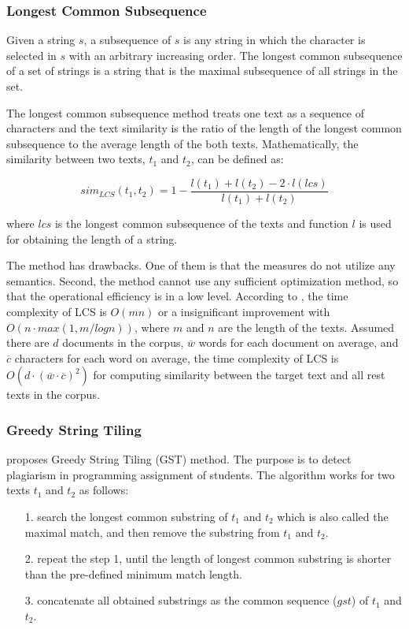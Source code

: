 \subsubsection{Longest Common Subsequence}

Given a string $s$, a subsequence of $s$ is any string in which the character is selected in $s$ with an arbitrary increasing order. The longest common subsequence of a set of strings is a string that is the maximal subsequence of all strings in the set. 

The longest common subsequence method treats one text as a sequence of characters and the text similarity is the ratio of the length of the longest common subsequence to the average length of the both texts. Mathematically, the similarity between two texts, $t_1$ and $t_2$, can be defined as: 

\begin{equation}
    sim_{LCS}(t_1, t_2) = 1 -  \frac{l(t_1) + l(t_2) - 2 \cdot l(lcs)}{l(t_1) + l(t_2)}
\end{equation}

where $lcs$ is the longest common subsequence of the texts and function $l$ is used for obtaining the length of a string. 

The method has drawbacks. One of them is that the measures do not utilize any semantics. Second, the method cannot use any sufficient optimization method, so that the operational efficiency is in a low level. According to \cite{paterson1994longest}, the time complexity of LCS is $O(mn)$ or a insignificant improvement with $O(n\cdot max(1, m/log n))$, where $m$ and $n$ are the length of the texts. Assumed there are $d$ documents in the corpus, $\overline{w}$ words for each document on average, and $\overline{c}$ characters for each word on average, the time complexity of LCS is $O(d \cdot (\overline{w} \cdot \overline{c})^2)$ for computing similarity between the target text and all rest texts in the corpus.

\subsubsection{Greedy String Tiling}

\cite{wise1993string} proposes Greedy String Tiling (GST) method. The purpose is to detect plagiarism in programming assignment of students. The algorithm works for two texts $t_1$ and $t_2$ as follows:
\begin{itemize}
    \item[1.] search the longest common substring of $t_1$ and $t_2$ which is also called the maximal match, and then remove the substring from $t_1$ and $t_2$.
    \item[2.] repeat the step 1, until the length of longest common substring is shorter than the pre-defined minimum match length.
    \item[3.] concatenate all obtained substrings as the common sequence ($gst$) of $t_1$ and $t_2$. 
\end{itemize}

